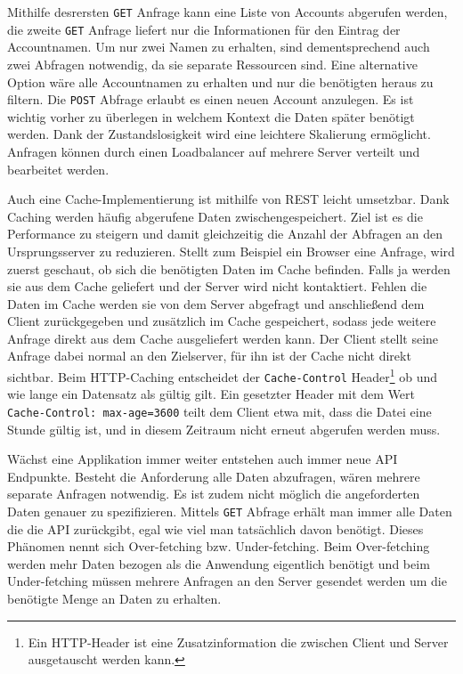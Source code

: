 Mithilfe desrersten \verb+GET+ Anfrage kann eine Liste von Accounts abgerufen werden, die zweite \verb+GET+ Anfrage liefert nur die Informationen für den Eintrag \grqq{}  der Accountnamen.
Um nur zwei Namen zu erhalten, sind dementsprechend auch zwei Abfragen notwendig, da sie separate Ressourcen sind.
Eine alternative Option wäre alle Accountnamen zu erhalten und nur die benötigten heraus zu filtern.
Die \verb+POST+ Abfrage erlaubt es einen neuen Account anzulegen.
Es ist wichtig vorher zu überlegen in welchem Kontext die Daten später benötigt werden.
Dank der Zustandslosigkeit wird eine leichtere Skalierung ermöglicht.
Anfragen können durch einen Loadbalancer auf mehrere Server verteilt und bearbeitet werden.

Auch eine Cache-Implementierung ist mithilfe von REST leicht umsetzbar.
Dank Caching werden häufig abgerufene Daten zwischengespeichert.
Ziel ist es die Performance zu steigern und damit gleichzeitig die Anzahl der Abfragen an den Ursprungsserver zu reduzieren.
Stellt zum Beispiel ein Browser eine Anfrage, wird zuerst geschaut, ob sich die benötigten Daten im Cache befinden.
Falls ja werden sie aus dem Cache geliefert und der Server wird nicht kontaktiert.
Fehlen die Daten im Cache werden sie von dem Server abgefragt und anschließend dem Client zurückgegeben und zusätzlich im Cache gespeichert, sodass jede weitere Anfrage direkt aus dem Cache ausgeliefert werden kann.
Der Client stellt seine Anfrage dabei normal an den Zielserver, für ihn ist der Cache nicht direkt sichtbar.
Beim HTTP-Caching entscheidet der \verb+Cache-Control+ Header\footnote{Ein HTTP-Header ist eine Zusatzinformation die zwischen Client und Server ausgetauscht werden kann.} ob und wie lange ein Datensatz als gültig gilt.
Ein gesetzter Header mit dem Wert \verb+Cache-Control: max-age=3600+ teilt dem Client etwa mit, dass die Datei eine Stunde gültig ist, und in diesem Zeitraum nicht erneut abgerufen werden muss. \cite[]{Cache}

Wächst eine Applikation immer weiter entstehen auch immer neue API Endpunkte.
Besteht die Anforderung alle Daten abzufragen, wären mehrere separate Anfragen notwendig.
Es ist zudem nicht möglich die angeforderten Daten genauer zu spezifizieren.
Mittels \verb+GET+ Abfrage erhält man immer alle Daten die die API zurückgibt, egal wie viel man tatsächlich davon benötigt.
Dieses Phänomen nennt sich Over-fetching bzw. Under-fetching.
Beim Over-fetching werden mehr Daten bezogen als die Anwendung eigentlich benötigt und beim Under-fetching müssen mehrere Anfragen an den Server gesendet werden um die benötigte Menge an Daten zu erhalten.\cite[]{API}

